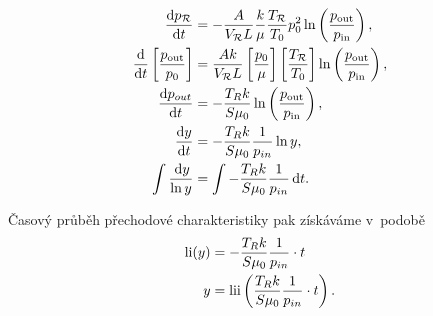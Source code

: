 \begin{subequations}
\begin{align}
    \frac{\mathrm{d} p_{\mathcal{R}}}{\mathrm{d} t}&=-\frac{A}{V_{\mathcal{R}}L}\frac{k}{\mu}\frac{T_{\mathcal{R}}}{T_0}p_0^2\ln\left(\frac{p_{\mathrm{out}}}{p_{\mathrm{in}}}\right),\\
    \frac{\mathrm{d} }{\mathrm{d} t}\left[\frac{p_{\mathrm{out}}}{p_0}\right]&=\frac{Ak}{V_{\mathcal{R}}L}\left[\frac{p_0}{\mu}\right]\left[\frac{T_{\mathcal{R}}}{T_0}\right]\ln\left(\frac{p_{\mathrm{out}}}{p_{\mathrm{in}}}\right),\\
    \frac{\mathrm{d} p_{out}}{\mathrm{d} t}&=-\frac{T_R k}{S\mu_0}\ln\left(\frac{p_{\mathrm{out}}}{p_{\mathrm{in}}}\right),\\
    \frac{\mathrm{d} y}{\mathrm{d} t}&=-\frac{T_R k}{S\mu_0}\frac{1}{p_{in}}\ln{y},\\
    \int\frac{\,\mathrm{d}{y}}{\ln{y}}&=\int-\frac{T_R k}{S\mu_0}\frac{1}{p_{in}}\,\mathrm{d}{t}.
\end{align}
\end{subequations}

Časový průběh přechodové charakteristiky pak získáváme v~podobě
\begin{subequations}
\begin{align}
    \operatorname{li}(y)&=-\frac{T_R k}{S\mu_0}\frac{1}{p_{in}}\cdot t\label{eq:logarithmic_step_implicit_original}\\
    y&=\operatorname{lii}\left(\frac{T_R k}{S\mu_0}\frac{1}{p_{in}}\cdot t\right).
\end{align}
\end{subequations}

